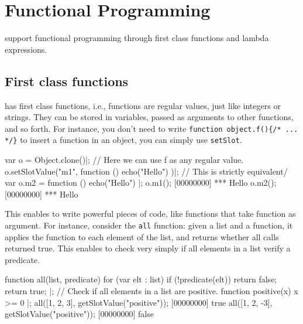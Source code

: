 
\chapter{Functional Programming}
\label{sec:tut:functional}

\us support functional programming through first class functions and
lambda expressions.

\section{First class functions}

\us has first class functions, i.e., functions are regular values,
just like integers or strings. They can be stored in variables,  passed
as arguments to other functions, and so forth. For instance, you don't need
to write
\lstinline|function object.f(){/* ... */}| to insert a function in an
object, you can simply use \lstinline{setSlot}.

\begin{urbiscript}[firstnumber=1]
var o = Object.clone()|;
// Here we can use f as any regular value.
o.setSlotValue("m1", function () { echo("Hello") })|;
// This is strictly equivalent/
var o.m2 = function () { echo("Hello") }|;
o.m1();
[00000000] *** Hello
o.m2();
[00000000] *** Hello
\end{urbiscript}

This enables to write powerful pieces of code, like functions that
take function as argument. For instance, consider the \lstinline{all}
function: given a list and a function, it applies the function to each
element of the list, and returns whether all calls returned true. This
enables to check very simply if all elements in a list verify a
predicate.

\begin{urbiscript}
function all(list, predicate)
{
  for (var elt : list)
    if (!predicate(elt))
      return false;
  return true;
}|;
// Check if all elements in a list are positive.
function positive(x) { x >= 0 }|;
all([1, 2, 3], getSlotValue("positive"));
[00000000] true
all([1, 2, -3], getSlotValue("positive"));
[00000000] false
\end{urbiscript}

